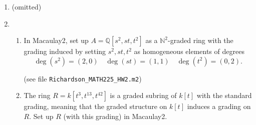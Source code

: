 \documentclass[11pt,oneside,english]{amsart}
\theoremstyle{definition}
\newcommand{\MB}[1]{\mathbb{#1}}
\begin{document}
\begin{enumerate}[leftmargin=*]
%
%

\item (omitted)



\item \begin{enumerate}
\itemsep5mm
\item In Macaulay2, set up $A = \MB{Q}[s^2,st,t^2]$ as a $\MB{N}^2$-graded ring with the grading induced by setting $s^2, st, t^2$ as homogeneous elements of degrees
\[
\deg(s^2) = (2,0) \quad \deg(st) = (1,1) \quad \deg(t^2) = (0,2).
\]

(see file \verb!Richardson_MATH225_HW2.m2!)
\item The ring $R=k[t^3,t^{13},t^{42}]$ is a graded subring of $k[t]$ with the standard grading, meaning that the graded structure on $k[t]$ induces a grading on $R$. Set up $R$ (with this grading) in Macaulay2.


\end{enumerate}
\end{enumerate}
\end{document}
